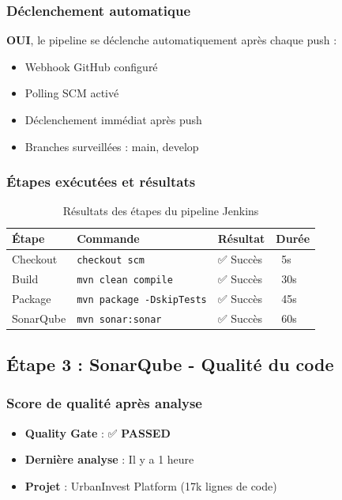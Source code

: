 \documentclass[12pt,a4paper]{article}
\begin{document}
\subsubsection{Déclenchement automatique}
\textbf{OUI}, le pipeline se déclenche automatiquement après chaque push :
\begin{itemize}
    \item Webhook GitHub configuré
    \item Polling SCM activé
    \item Déclenchement immédiat après push
    \item Branches surveillées : main, develop
\end{itemize}

\subsubsection{Étapes exécutées et résultats}
\begin{table}[H]
\centering
\begin{tabular}{|l|l|l|l|}
\hline
\textbf{Étape} & \textbf{Commande} & \textbf{Résultat} & \textbf{Durée} \\
\hline
Checkout & \texttt{checkout scm} & ✅ Succès & ~5s \\
Build & \texttt{mvn clean compile} & ✅ Succès & ~30s \\
Package & \texttt{mvn package -DskipTests} & ✅ Succès & ~45s \\
SonarQube & \texttt{mvn sonar:sonar} & ✅ Succès & ~60s \\
\hline
\end{tabular}
\caption{Résultats des étapes du pipeline Jenkins}
\end{table}

\subsection{Étape 3 : SonarQube - Qualité du code}

\subsubsection{Score de qualité après analyse}
\begin{itemize}
    \item \textbf{Quality Gate} : ✅ \textbf{PASSED}
    \item \textbf{Dernière analyse} : Il y a 1 heure
    \item \textbf{Projet} : UrbanInvest Platform (17k lignes de code)
\end{itemize}
\end{document}
